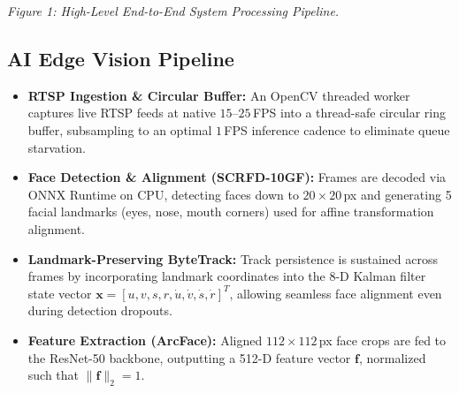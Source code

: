 \documentclass[10pt, a4paper]{article}
\begin{document}
\vspace{2pt}
\begin{center}
\small
{}
\end{center}
\vspace{-2pt}
\centerline{\footnotesize\textit{Figure 1: High-Level End-to-End System Processing Pipeline.}}

\subsection{AI Edge Vision Pipeline}
\begin{itemize}
    \item \textbf{RTSP Ingestion \& Circular Buffer:} An OpenCV threaded worker captures live RTSP feeds at native $15$--$25$\,FPS into a thread-safe circular ring buffer, subsampling to an optimal $1$\,FPS inference cadence to eliminate queue starvation.
    \item \textbf{Face Detection \& Alignment (SCRFD-10GF):} Frames are decoded via ONNX Runtime on CPU, detecting faces down to $20\times20$\,px and generating 5 facial landmarks (eyes, nose, mouth corners) used for affine transformation alignment.
    \item \textbf{Landmark-Preserving ByteTrack:} Track persistence is sustained across frames by incorporating landmark coordinates into the 8-D Kalman filter state vector $\mathbf{x} = [u, v, s, r, \dot{u}, \dot{v}, \dot{s}, \dot{r}]^T$, allowing seamless face alignment even during detection dropouts.
    \item \textbf{Feature Extraction (ArcFace):} Aligned $112\times112$\,px face crops are fed to the ResNet-50 backbone, outputting a 512-D feature vector $\mathbf{f}$, normalized such that $\|\mathbf{f}\|_2 = 1$.
\end{itemize}
\end{document}
